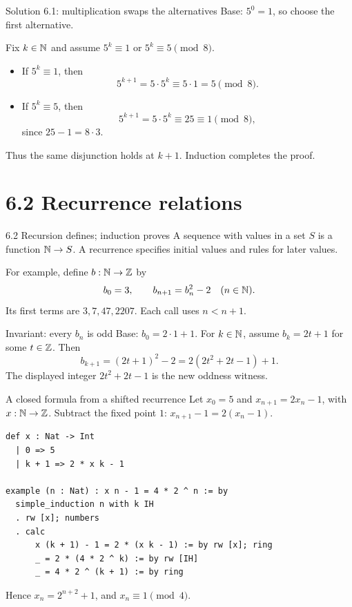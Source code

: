 \begin{frame}{Solution 6.1: multiplication swaps the alternatives}
Base: $5^0=1$, so choose the first alternative.

Fix $k\in\mathbb{N}$ and assume $5^k\equiv1$ or $5^k\equiv5\pmod8$.
\begin{itemize}
\item If $5^k\equiv1$, then
\[
 5^{k+1}=5\cdot5^k\equiv5\cdot1=5\pmod8.
\]
\item If $5^k\equiv5$, then
\[
 5^{k+1}=5\cdot5^k\equiv25\equiv1\pmod8,
\]
since $25-1=8\cdot3$.
\end{itemize}
Thus the same disjunction holds at $k+1$. Induction completes the proof.
\end{frame}

\section{6.2 Recurrence relations}
\begin{frame}{6.2 Recursion defines; induction proves}
A sequence with values in a set $S$ is a function $\mathbb{N}\to S$.
A recurrence specifies initial values and rules for later values.

For example, define $b:\mathbb{N}\to\mathbb{Z}$ by
\[
 b_0=3,\qquad b_{n+1}=b_n^2-2\quad(n\in\mathbb{N}).
\]
Its first terms are $3,7,47,2207$. Each call uses $n<n+1$.
\begin{block}{Invariant: every $b_n$ is odd}
Base: $b_0=2\cdot1+1$.
For $k\in\mathbb{N}$, assume $b_k=2t+1$ for some $t\in\mathbb{Z}$. Then
\[
 b_{k+1}=(2t+1)^2-2=2(2t^2+2t-1)+1.
\]
The displayed integer $2t^2+2t-1$ is the new oddness witness.
\end{block}
\end{frame}

\begin{frame}[fragile]{A closed formula from a shifted recurrence}
Let $x_0=5$ and $x_{n+1}=2x_n-1$, with $x:\mathbb{N}\to\mathbb{Z}$.
Subtract the fixed point $1$: $x_{n+1}-1=2(x_n-1)$.
\begin{lstlisting}
def x : Nat -> Int
  | 0 => 5
  | k + 1 => 2 * x k - 1

example (n : Nat) : x n - 1 = 4 * 2 ^ n := by
  simple_induction n with k IH
  . rw [x]; numbers
  . calc
      x (k + 1) - 1 = 2 * (x k - 1) := by rw [x]; ring
      _ = 2 * (4 * 2 ^ k) := by rw [IH]
      _ = 4 * 2 ^ (k + 1) := by ring
\end{lstlisting}
Hence $x_n=2^{n+2}+1$, and $x_n\equiv1\pmod4$.
\end{frame}

